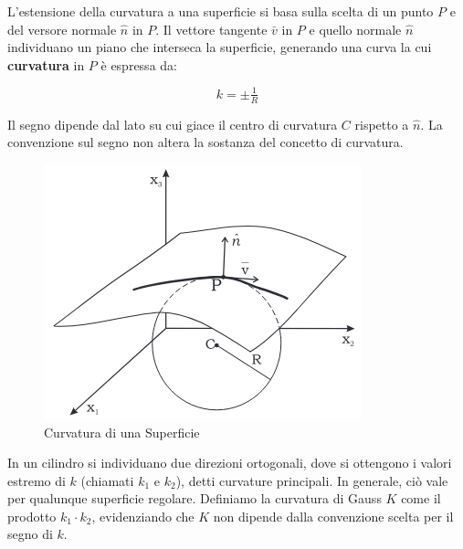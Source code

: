 \begin{minipage}[H]{0.55\textwidth}
    L'estensione della curvatura a una superficie si basa sulla scelta di un punto $P$ e del versore normale $\hat{n}$ in $P$. Il vettore tangente $\bar v$ in $P$ e quello normale $\hat{n}$ individuano un piano che interseca la superficie, generando una curva la cui \textbf{curvatura} in $P$ è espressa da:

    $$k = \pm \tfrac{1}{R}$$

    Il segno dipende dal lato su cui giace il centro di curvatura $C$ rispetto a $\hat{n}$. La convenzione sul segno non altera la sostanza del concetto di curvatura.
\end{minipage}%
\hspace{0.04\textwidth}
\begin{minipage}{0.4\textwidth}
    \begin{figure}[H]
        \centering
        \includegraphics[width=\textwidth]{assets/surface_curv.png}
        \caption{Curvatura di una Superficie}
        \label{fig:curvatura_superficie}
    \end{figure}
\end{minipage}

In un cilindro si individuano due direzioni ortogonali, dove si ottengono i valori estremo di $k$ (chiamati $k_1$ e $k_2$), detti curvature principali. In generale, ciò vale per qualunque superficie regolare. Definiamo la curvatura di Gauss $K$ come il prodotto $k_1 \cdot k_2$, evidenziando che $K$ non dipende dalla convenzione scelta per il segno di $k$.

